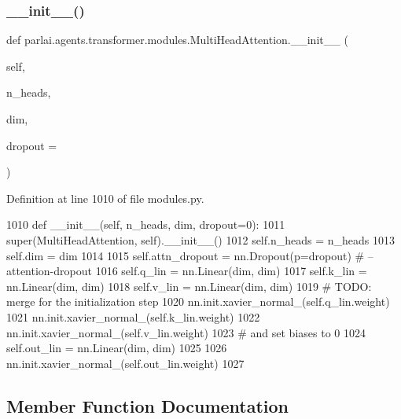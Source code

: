 \subsubsection{\texorpdfstring{\+\_\+\+\_\+init\+\_\+\+\_\+()}{\_\_init\_\_()}}
{\footnotesize\ttfamily def parlai.\+agents.\+transformer.\+modules.\+Multi\+Head\+Attention.\+\_\+\+\_\+init\+\_\+\+\_\+ (\begin{DoxyParamCaption}\item[{}]{self,  }\item[{}]{n\+\_\+heads,  }\item[{}]{dim,  }\item[{}]{dropout = {} }\end{DoxyParamCaption})}



Definition at line 1010 of file modules.\+py.


\begin{DoxyCode}
1010     \textcolor{keyword}{def }\_\_init\_\_(self, n\_heads, dim, dropout=0):
1011         super(MultiHeadAttention, self).\_\_init\_\_()
1012         self.n\_heads = n\_heads
1013         self.dim = dim
1014 
1015         self.attn\_dropout = nn.Dropout(p=dropout)  \textcolor{comment}{# --attention-dropout}
1016         self.q\_lin = nn.Linear(dim, dim)
1017         self.k\_lin = nn.Linear(dim, dim)
1018         self.v\_lin = nn.Linear(dim, dim)
1019         \textcolor{comment}{# TODO: merge for the initialization step}
1020         nn.init.xavier\_normal\_(self.q\_lin.weight)
1021         nn.init.xavier\_normal\_(self.k\_lin.weight)
1022         nn.init.xavier\_normal\_(self.v\_lin.weight)
1023         \textcolor{comment}{# and set biases to 0}
1024         self.out\_lin = nn.Linear(dim, dim)
1025 
1026         nn.init.xavier\_normal\_(self.out\_lin.weight)
1027 
\end{DoxyCode}


\subsection{Member Function Documentation}
\mbox{\label{classparlai_1_1agents_1_1transformer_1_1modules_1_1MultiHeadAttention_a504eb3bb3e4b241e8461d78a0c3cbc03}} 
